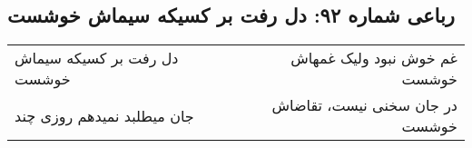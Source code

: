 \begin{center}
\section*{رباعی شماره ۹۲: دل رفت بر کسیکه سیماش خوشست}
\label{sec:sh092}
\begin{longtable}{l p{0.5cm} r}
دل رفت بر کسیکه سیماش خوشست
&&
غم خوش نبود ولیک غمهاش خوشست
\\
جان میطلبد نمیدهم روزی چند
&&
در جان سخنی نیست، تقاضاش خوشست
\\
\end{longtable}
\end{center}
